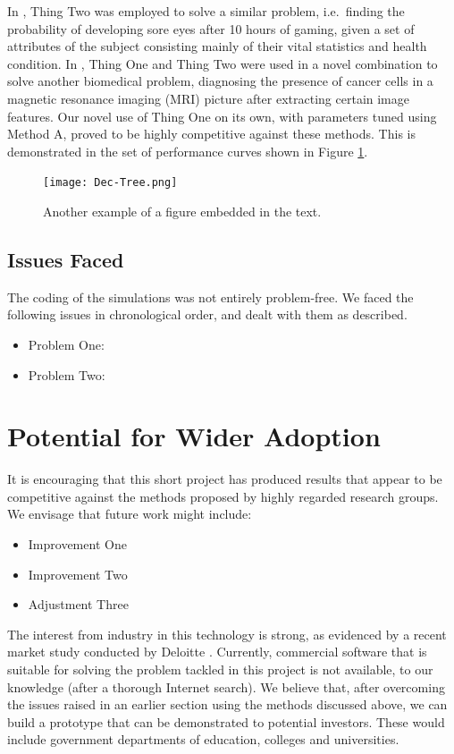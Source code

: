 \documentclass[12pt,a4paper]{article}
\begin{document}
	In \cite{einstein}, Thing Two was employed to solve a similar problem, i.e.\ finding the probability of developing sore eyes after 10 hours of gaming, given a set of attributes of the subject consisting mainly of their vital statistics and health condition. In \cite{knuthwebsite}, Thing One and Thing Two were used in a novel combination to solve another biomedical problem, diagnosing the presence of cancer cells in a magnetic resonance imaging (MRI) picture after extracting certain image features. Our novel use of Thing One on its own, with parameters tuned using Method A, proved to be highly competitive against these methods. This is demonstrated in the set of performance curves shown in Figure \ref{fig:two}.
	
	\begin{figure}
	\begin{center}
		\texttt{[image: Dec-Tree.png]}
	\end{center}
	\caption{Another example of a figure embedded in the text.}
	\label{fig:two}
	\end{figure}	

	\subsection{Issues Faced} \label{sec:issue}
	The coding of the simulations was not entirely problem-free. We faced the following issues in chronological order, and dealt with them as described.
	\begin{itemize}
		\item Problem One:
		\item Problem Two:
	\end{itemize}

	\section{Potential for Wider Adoption}
	It is encouraging that this short project has produced results that appear to be competitive against the methods proposed by highly regarded research groups. We envisage that future work might include:
	\begin{itemize}
		\item Improvement One
		\item Improvement Two
		\item Adjustment Three
	\end{itemize}

	The interest from industry in this technology is strong, as evidenced by a recent market study conducted by Deloitte \cite{latexcompanion}. Currently, commercial software that is suitable for solving the problem tackled in this project is not available, to our knowledge (after a thorough Internet search). We believe that, after overcoming the issues raised in an earlier section using the methods discussed above, we can build a prototype that can be demonstrated to potential investors. These would include government departments of education, colleges and universities.
	
\end{document}
